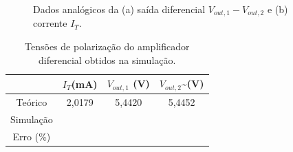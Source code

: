 \documentclass[a4paper,12pt,oneside,openany,table,xcdraw]{article}
\begin{document}
\begin{figure}[H]
\center
{}\hfill
{}
\caption{Dados analógicos da (a) saída diferencial $V_{out,1} - V_{out,2}$ e (b) corrente $I_{T}$.}
\label{sim:conclusoes}
\end{figure}

\vspace{0.3cm}
\begin{table} [H]
\centering
\def\arraystretch{1.38}
\caption{Tensões de polarização do amplificador diferencial obtidos na simulação.} \label{sim:dados}
\label{dados}
\begin{tabular}{|c|c|c|c|} 
\hhline{~---|}
\multicolumn{1}{c|}{}                         & {\cellcolor[rgb]{0.937,0.937,0.937}}\textbf{$I_{T}$(mA)}  & {\cellcolor[rgb]{0.937,0.937,0.937}}\textbf{$V_{out, 1}$ (V)}  & {\cellcolor[rgb]{0.937,0.937,0.937}}\textbf{$V_{out, 2}$\textasciitilde{}(V)}   \\ 
\hline
{\cellcolor[rgb]{0.937,0.937,0.937}}Teórico   & 2,0179                                                    & 5,4420                                                         & 5,4452                                                                          \\ 
\hline
{\cellcolor[rgb]{0.937,0.937,0.937}}Simulação &                                                           &                                                                &                                                                                 \\ 
\hline
{\cellcolor[rgb]{0.937,0.937,0.937}}Erro (\%) &                                                           &                                                                &                                                                                 \\
\hline
\end{tabular}
\end{table}
\end{document}
